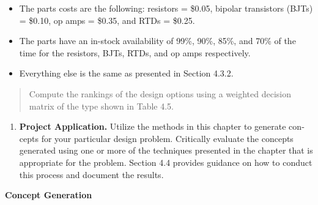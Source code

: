 \begin{itemize}
\item
  The parts costs are the following: resistors = \$0.05, bipolar
  transistors (BJTs) = \$0.10, op amps = \$0.35, and RTDs = \$0.25.
\item
  The parts have an in-stock availability of 99\%, 90\%, 85\%, and 70\%
  of the time for the re­sistors, BJTs, RTDs, and op amps respectively.
\item
  Everything else is the same as presented in Section 4.3.2.
\end{itemize}

\begin{quote}
Compute the rankings of the design options using a weighted decision
matrix of the type shown in Table 4.5.
\end{quote}

\begin{enumerate}
\def\labelenumi{\arabic{enumi}.}
\item
  \textbf{Project Application.} Utilize the methods in this chapter to
  generate con­cepts for your particular design problem. Critically
  evaluate the concepts generated using one or more of the techniques
  presented in the chapter that is appropriate for the problem. Section
  4.4 pro­vides guidance on how to conduct this process and document the
  results.
\end{enumerate}

\textbf{Concept Generation}
